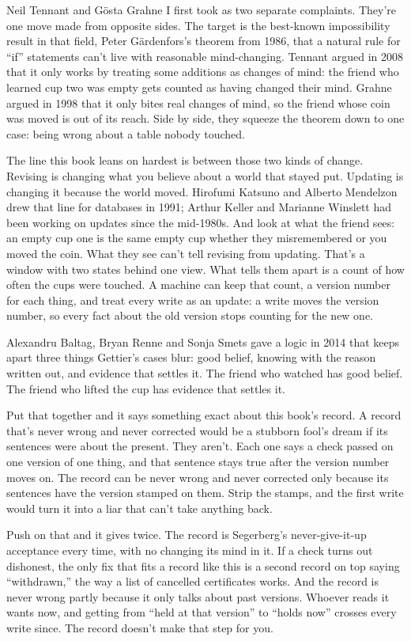 \documentclass[11pt,twoside]{article}
\theoremstyle{thielethm}
\theoremstyle{thieledef}
\theoremstyle{thieledef}
\theoremstyle{thieledef}
\theoremstyle{thielethm}
\theoremstyle{thieleobs}
\theoremstyle{thielethm}
\begin{document}
Neil Tennant and Gösta Grahne I first took as two separate complaints. They're one move made from opposite sides. The target is the best-known impossibility result in that field, Peter Gärdenfors's theorem from 1986, that a natural rule for ``if'' statements can't live with reasonable mind-changing. Tennant argued in 2008 that it only works by treating some additions as changes of mind: the friend who learned cup two was empty gets counted as having changed their mind. Grahne argued in 1998 that it only bites real changes of mind, so the friend whose coin was moved is out of its reach. Side by side, they squeeze the theorem down to one case: being wrong about a table nobody touched.

The line this book leans on hardest is between those two kinds of change. Revising is changing what you believe about a world that stayed put. Updating is changing it because the world moved. Hirofumi Katsuno and Alberto Mendelzon drew that line for databases in 1991; Arthur Keller and Marianne Winslett had been working on updates since the mid-1980s. And look at what the friend sees: an empty cup one is the same empty cup whether they misremembered or you moved the coin. What they see can't tell revising from updating. That's a window with two states behind one view. What tells them apart is a count of how often the cups were touched. A machine can keep that count, a version number for each thing, and treat every write as an update: a write moves the version number, so every fact about the old version stops counting for the new one.

Alexandru Baltag, Bryan Renne and Sonja Smets gave a logic in 2014 that keeps apart three things Gettier's cases blur: good belief, knowing with the reason written out, and evidence that settles it. The friend who watched has good belief. The friend who lifted the cup has evidence that settles it.

Put that together and it says something exact about this book's record. A record that's never wrong and never corrected would be a stubborn fool's dream if its sentences were about the present. They aren't. Each one says a check passed on one version of one thing, and that sentence stays true after the version number moves on. The record can be never wrong and never corrected only because its sentences have the version stamped on them. Strip the stamps, and the first write would turn it into a liar that can't take anything back.

Push on that and it gives twice. The record is Segerberg's never-give-it-up acceptance every time, with no changing its mind in it. If a check turns out dishonest, the only fix that fits a record like this is a second record on top saying ``withdrawn,'' the way a list of cancelled certificates works. And the record is never wrong partly because it only talks about past versions. Whoever reads it wants now, and getting from ``held at that version'' to ``holds now'' crosses every write since. The record doesn't make that step for you.
\end{document}
